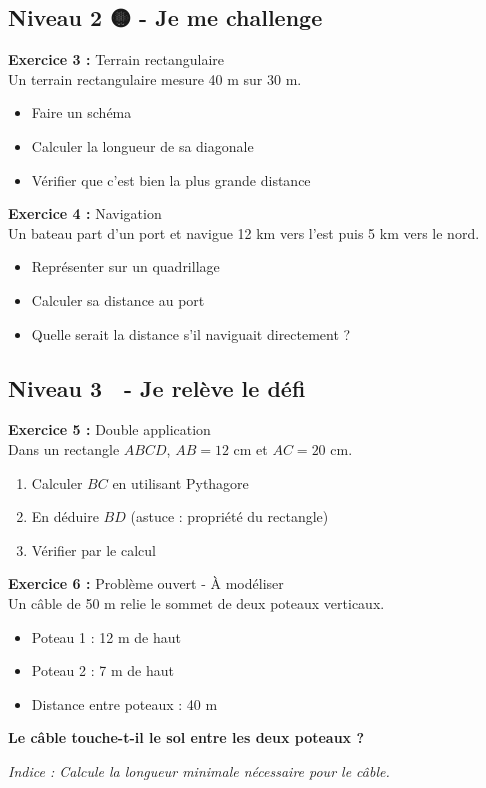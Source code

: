 \subsection{Niveau 2 🟡 - Je me challenge}

\begin{exercisebox}
	\textbf{Exercice 3 :} Terrain rectangulaire\\
	Un terrain rectangulaire mesure 40 m sur 30 m. 
	\begin{itemize}
		\item Faire un schéma
		\item Calculer la longueur de sa diagonale
		\item Vérifier que c'est bien la plus grande distance
	\end{itemize}
	
	\textbf{Exercice 4 :} Navigation\\
	Un bateau part d'un port et navigue 12 km vers l'est puis 5 km vers le nord.
	\begin{itemize}
		\item Représenter sur un quadrillage
		\item Calculer sa distance au port
		\item Quelle serait la distance s'il naviguait directement ?
	\end{itemize}
\end{exercisebox}

\subsection{Niveau 3 🔴 - Je relève le défi}

\begin{exercisebox}
	\textbf{Exercice 5 :} Double application\\
	Dans un rectangle $ABCD$, $AB = 12$ cm et $AC = 20$ cm.
	\begin{enumerate}
		\item Calculer $BC$ en utilisant Pythagore
		\item En déduire $BD$ (astuce : propriété du rectangle)
		\item Vérifier par le calcul
	\end{enumerate}
	
	\textbf{Exercice 6 :} Problème ouvert - À modéliser\\
	Un câble de 50 m relie le sommet de deux poteaux verticaux. 
	\begin{itemize}
		\item Poteau 1 : 12 m de haut
		\item Poteau 2 : 7 m de haut  
		\item Distance entre poteaux : 40 m
	\end{itemize}
	\textbf{Le câble touche-t-il le sol entre les deux poteaux ?}
	
	\emph{Indice : Calcule la longueur minimale nécessaire pour le câble.}
\end{exercisebox}


